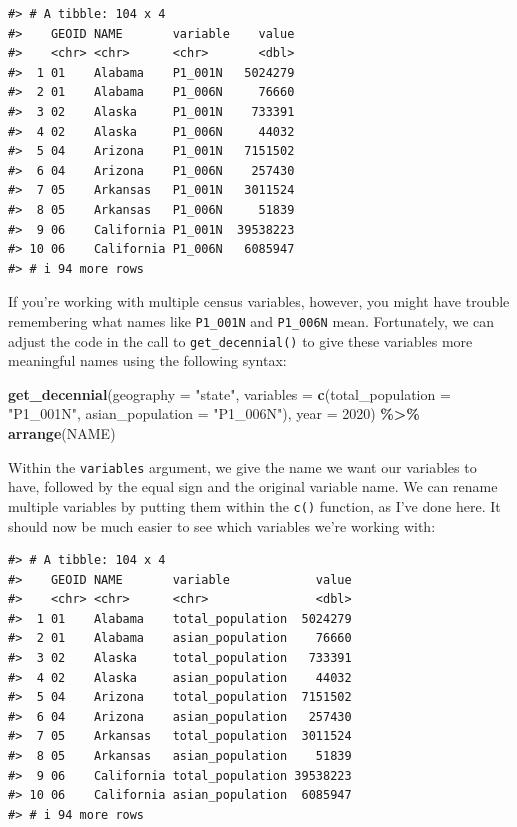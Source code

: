 \documentclass[
]{book}
\newenvironment{Shaded}{\begin{snugshade}}{\end{snugshade}}
\newcommand{\AttributeTok}[1]{\textcolor[rgb]{0.13,0.29,0.53}{#1}}
\newcommand{\DecValTok}[1]{\textcolor[rgb]{0.00,0.00,0.81}{#1}}
\newcommand{\FunctionTok}[1]{\textcolor[rgb]{0.13,0.29,0.53}{\textbf{#1}}}
\newcommand{\NormalTok}[1]{#1}
\newcommand{\SpecialCharTok}[1]{\textcolor[rgb]{0.81,0.36,0.00}{\textbf{#1}}}
\newcommand{\StringTok}[1]{\textcolor[rgb]{0.31,0.60,0.02}{#1}}
\begin{document}
\begin{verbatim}
#> # A tibble: 104 x 4
#>    GEOID NAME       variable    value
#>    <chr> <chr>      <chr>       <dbl>
#>  1 01    Alabama    P1_001N   5024279
#>  2 01    Alabama    P1_006N     76660
#>  3 02    Alaska     P1_001N    733391
#>  4 02    Alaska     P1_006N     44032
#>  5 04    Arizona    P1_001N   7151502
#>  6 04    Arizona    P1_006N    257430
#>  7 05    Arkansas   P1_001N   3011524
#>  8 05    Arkansas   P1_006N     51839
#>  9 06    California P1_001N  39538223
#> 10 06    California P1_006N   6085947
#> # i 94 more rows
\end{verbatim}

If you're working with multiple census variables, however, you might have trouble remembering what names like \texttt{P1\_001N} and \texttt{P1\_006N} mean. Fortunately, we can adjust the code in the call to \texttt{get\_decennial()} to give these variables more meaningful names using the following syntax:

\begin{Shaded}
\begin{Highlighting}[]
\FunctionTok{get\_decennial}\NormalTok{(}\AttributeTok{geography =} \StringTok{"state"}\NormalTok{, }
              \AttributeTok{variables =} \FunctionTok{c}\NormalTok{(}\AttributeTok{total\_population =} \StringTok{"P1\_001N"}\NormalTok{, }
                            \AttributeTok{asian\_population =} \StringTok{"P1\_006N"}\NormalTok{),}
              \AttributeTok{year =} \DecValTok{2020}\NormalTok{) }\SpecialCharTok{\%\textgreater{}\%} 
  \FunctionTok{arrange}\NormalTok{(NAME)}
\end{Highlighting}
\end{Shaded}

Within the \texttt{variables} argument, we give the name we want our variables to have, followed by the equal sign and the original variable name. We can rename multiple variables by putting them within the \texttt{c()} function, as I've done here. It should now be much easier to see which variables we're working with:

\begin{verbatim}
#> # A tibble: 104 x 4
#>    GEOID NAME       variable            value
#>    <chr> <chr>      <chr>               <dbl>
#>  1 01    Alabama    total_population  5024279
#>  2 01    Alabama    asian_population    76660
#>  3 02    Alaska     total_population   733391
#>  4 02    Alaska     asian_population    44032
#>  5 04    Arizona    total_population  7151502
#>  6 04    Arizona    asian_population   257430
#>  7 05    Arkansas   total_population  3011524
#>  8 05    Arkansas   asian_population    51839
#>  9 06    California total_population 39538223
#> 10 06    California asian_population  6085947
#> # i 94 more rows
\end{verbatim}
\end{document}

